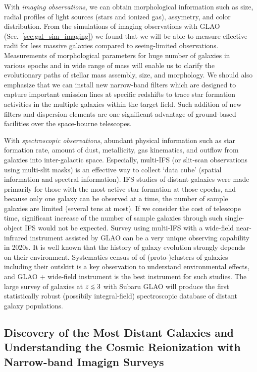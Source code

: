 With {\it imaging observations}, we can obtain morphological information
such as size, radial profiles of light sources (stars and ionized gas),
assymetry, and color distribution. From the simulations of imaging
observations with GLAO (Sec.~\ref{sec:gal_sim_imaging}) we found that we
will be able to measure effective radii for less massive galaxies
compared to seeing-limited observations. Measurements of morphological
parameters for huge number of galaxies in various epochs and in wide 
range of mass will enable us to clarify the evolutionary paths of
stellar mass assembly, size, and morphology. We should also emphasize
that we can install new narrow-band filters which are designed to
capture important emission lines at specific redshifts to trace star
formation activities in the multiple galaxies within the target
field. Such addition of new filters and dispersion elements are one
significant advantage of ground-based facilities over the space-bourne
telescopes.

With {\it spectroscopic observations}, abundant physical information
such as star formation rate, amount of dust, metallicity, gas
kinematics, and outflow from galaxies into inter-galactic space. 
Especially, multi-IFS (or slit-scan observations using multi-slit masks)
is an effective way to collect `data cube' (spatial information and
spectral information). IFS studies of distant galaxies were made
primarily for those with the most active star formation at those
epochs, and because only one galaxy can be observed at a time, the
number of sample galaxies are limited (several tens at most). If we
consider the cost of telescope time, significant increase of the number
of sample galaxies through such single-object IFS would not be
expected. Survey using multi-IFS with a wide-field near-infrared 
instrument assisted by GLAO can be a very unique observing capability in
2020s. 
It is well known that the history of galaxy evolution strongly depends
on their environment. Systematics census of of (proto-)clusters of
galaxies including their outskirt is a key observation to understand
environmental effects, and GLAO + wide-field instrument is the best
instrument for such studies. 
The large survey of galaxies at $z\lsim 3$ with Subaru GLAO will produce
the first statistically robust (possibily integral-field) spectroscopic
database of distant galaxy populations.


\subsection{Discovery of the Most Distant Galaxies and Understanding the
  Cosmic Reionization with Narrow-band Imagign Surveys}


